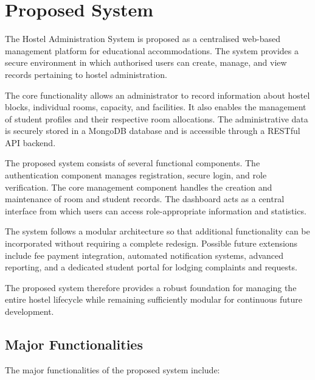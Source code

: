 \section{Proposed System}

The Hostel Administration System is proposed as a centralised web-based management platform for educational accommodations. The system provides a secure environment in which authorised users can create, manage, and view records pertaining to hostel administration.

The core functionality allows an administrator to record information about hostel blocks, individual rooms, capacity, and facilities. It also enables the management of student profiles and their respective room allocations. The administrative data is securely stored in a MongoDB database and is accessible through a RESTful API backend.

The proposed system consists of several functional components. The authentication component manages registration, secure login, and role verification. The core management component handles the creation and maintenance of room and student records. The dashboard acts as a central interface from which users can access role-appropriate information and statistics.

The system follows a modular architecture so that additional functionality can be incorporated without requiring a complete redesign. Possible future extensions include fee payment integration, automated notification systems, advanced reporting, and a dedicated student portal for lodging complaints and requests.

The proposed system therefore provides a robust foundation for managing the entire hostel lifecycle while remaining sufficiently modular for continuous future development.

\subsection{Major Functionalities}

The major functionalities of the proposed system include:

